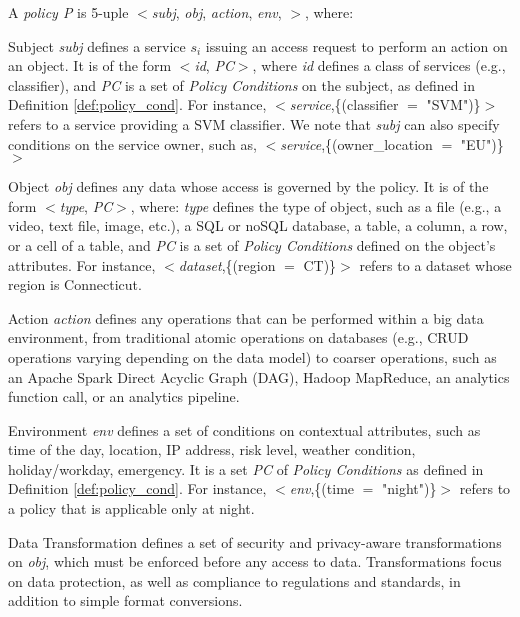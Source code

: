 \begin{definition}[Policy]\label{def:policy_rule}
  A {\it policy P} is 5-uple $<$\textit{subj}, \textit{obj}, \textit{action}, \textit{env}, \textit{\TP}$>$, where:
  \begin{description}
    \item Subject \textit{subj} defines a service $s_i$ issuing an access request to perform an action on an object. It is of the form $<$\emph{id}, \emph{PC}$>$, where \emph{id} defines a class of services (e.g., classifier), and \emph{PC} is a set of \emph{Policy Conditions} on the subject, as defined in Definition \ref{def:policy_cond}. For instance, $<$\emph{service},\{(classifier $=$ "SVM")\}$>$ refers to a service providing a SVM classifier. We note that \textit{subj} can also specify conditions on the service owner, such as, $<$\emph{service},\{(owner\_location $=$ "EU")\}$>$

    \item Object \textit{obj} defines any data whose access is governed by the policy. It is of the form $<$\emph{type}, \emph{PC}$>$, where: \emph{type} defines the type of object, such as a file (e.g., a video, text file, image, etc.), a SQL or noSQL database, a table, a column, a row, or a cell of a table, and \emph{PC} is a set of \emph{Policy Conditions} defined on the object's attributes. For instance, $<$\emph{dataset},\{(region $=$ CT)\}$>$ refers to a dataset whose region is Connecticut.

    \item Action \textit{action} defines any operations that can be performed within a big data environment, from traditional atomic operations on databases (e.g., CRUD operations varying depending on the data model) to coarser operations, such as an Apache Spark Direct Acyclic Graph (DAG), Hadoop MapReduce, an analytics function call, or an analytics pipeline.

    \item Environment \textit{env} defines a set of conditions on contextual attributes, such as time of the day, location, IP address, risk level, weather condition, holiday/workday, emergency. It is a set \emph{PC} of \emph{Policy Conditions} as defined in Definition \ref{def:policy_cond}. For instance, $<$\emph{env},\{(time $=$ "night")\}$>$ refers to a policy that is applicable only at night.

    \item Data Transformation \textit{\TP} defines a set of security and privacy-aware transformations on \textit{obj}, which must be enforced before any access to data. Transformations focus on data protection, as well as compliance to regulations and standards, in addition to simple format conversions.
  \end{description}
\end{definition}

